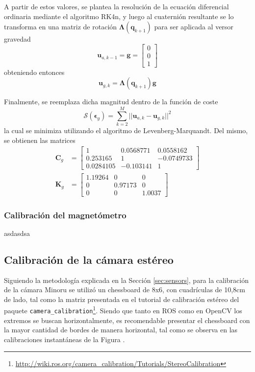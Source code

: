 A partir de estos valores, se plantea la resolución de la ecuación diferencial ordinaria mediante el algoritmo RK4n, y luego al cuaternión resultante se lo transforma en una matriz de rotación $\bm{\Lambda}(\bm{q}_{k+1})$ para ser aplicada al versor gravedad
\begin{equation}
    \bm{u}_{a,k-1} = \bm{g} =
    \begin{bmatrix}
        0 \\
        0 \\
        1
    \end{bmatrix}
\end{equation}
obteniendo entonces
\begin{equation}
    \bm{u}_{g,k} = \bm{\Lambda}(\bm{q}_{k+1})\bm{g}
\end{equation}

Finalmente, se reemplaza dicha magnitud dentro de la función de coste
\begin{equation}
    \mathscr{S}(\bm{\epsilon}_{g}) = \sum_{k=2}^M ||\bm{u}_{a,k} - \bm{u}_{g,k}||^2
\end{equation}
la cual se minimiza utilizando el algoritmo de Levenberg-Marquandt. Del mismo, se obtienen las matrices
\begin{align}
        \bm{C}_g &=
    \begin{bmatrix}
        1 & 0.0568771 & 0.0558162 \\
        0.253165 & 1 & -0.0749733 \\
        0.0284105 & -0.103141 & 1
    \end{bmatrix}
    \\
        \bm{K}_g &=
    \begin{bmatrix}
        1.19264 & 0 & 0 \\
        0 & 0.97173 & 0 \\
        0 & 0 & 1.0037
    \end{bmatrix}
\end{align}

\subsubsection{Calibración del magnetómetro}
asdasdsa

\subsection{Calibración de la cámara estéreo}
Siguiendo la metodología explicada en la Sección \ref{sec:sensors}, para la calibración de la cámara Minoru se utilizó un chessboard de 8x6, con cuadrículas de 10,8cm de lado, tal como la matriz presentada en el tutorial de calibración estéreo del paquete \texttt{camera\_calibration}\footnote{\url{http://wiki.ros.org/camera_calibration/Tutorials/StereoCalibration}}. Siendo que tanto en ROS como en OpenCV los extremos se buscan horizontalmente, es recomendable presentar el chessboard con la mayor cantidad de bordes de manera horizontal, tal como se observa en las calibraciones instantáneas de la Figura .

